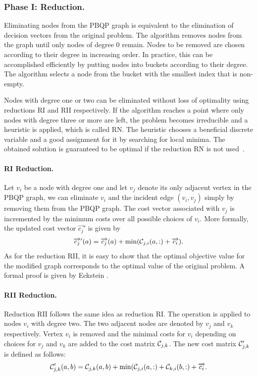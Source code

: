 \subsubsection{Phase I: Reduction.} Eliminating nodes from the PBQP graph
is equivalent to the elimination of decision vectors from the original
problem. The algorithm removes nodes from the graph until only nodes
of degree $0$ remain. Nodes to be removed are chosen according to
their degree in increasing order. In practice, this can be
accomplished efficiently by putting nodes into buckets according to
their degree. The algorithm selects a node from the bucket with the
smallest index that is non-empty.

Nodes with degree one or two can be eliminated without loss of
optimality using reductions RI and RII respectively. If the algorithm
reaches a point where only nodes with degree three or more are left,
the problem becomes irreducible and a heuristic is applied, which is
called RN. The heuristic chooses a beneficial discrete variable and a
good assignment for it by searching for local minima. The obtained
solution is guaranteed to be optimal if the reduction RN is not
used~\cite{Eck03}.

\paragraph{RI Reduction.}
Let $v_i$ be a node with degree one and let $v_j$ denote its only
adjacent vertex in the PBQP graph, we can eliminate $v_i$ and the
incident edge $(v_i, v_j)$ simply by removing them from the PBQP
graph. The cost vector associated with $v_j$ is incremented by the
minimum costs over all possible choices of $v_i$. More formally, the
updated cost vector $\vec{c_j}'$ is given by
$$\overrightarrow{c_j}'(a) = \overrightarrow{c_j}(a) + \min({\mathcal C}_{j,i}(a,:) +
\overrightarrow{c_i}).$$ As for the reduction RII, it is easy to show that the
optimal objective value for the modified graph corresponds to the
optimal value of the original problem. A formal proof is given by
Eckstein \cite{Eck03}.

\paragraph{RII Reduction.}
Reduction RII follows the same idea as reduction RI. The operation is
applied to nodes $v_i$ with degree two. The two adjacent nodes are
denoted by $v_j$ and $v_k$ respectively. Vertex $v_i$ is removed and
the minimal costs for $v_i$ depending on choices for $v_j$ and $v_k$
are added to the cost matrix ${\mathcal C}_{j,k}$. The new cost
matrix ${\mathcal C}'_{j,k}$ is defined as follows:
$${\mathcal C}'_{j,k}(a,b) = {\mathcal C}_{j,k}(a,b) +
\min({\mathcal C}_{j,i}(a,:) + {\mathcal C}_{k,i}(b,:) + \overrightarrow{c_i}.$$

